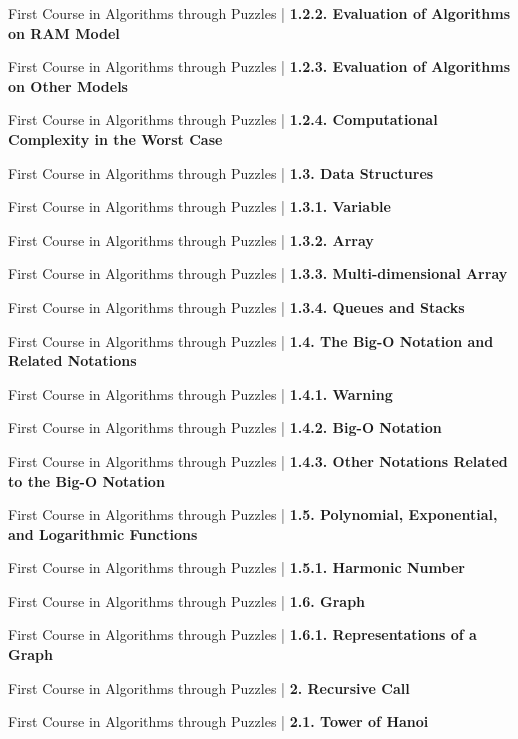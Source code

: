 \documentclass[a4, landscape, 12pt]{article}
\newcommand{\checkbox}{$\square$}%
\begin{document}
\begin{itemize}
{\item [\checkbox]  First Course in Algorithms through Puzzles | \textbf{ 1.2.2. Evaluation of Algorithms on RAM Model
}
\item [\checkbox]  First Course in Algorithms through Puzzles | \textbf{ 1.2.3. Evaluation of Algorithms on Other Models
}
\item [\checkbox]  First Course in Algorithms through Puzzles | \textbf{ 1.2.4. Computational Complexity in the Worst Case
}
\item [\checkbox]  First Course in Algorithms through Puzzles | \textbf{ 1.3. Data Structures
}
\item [\checkbox]  First Course in Algorithms through Puzzles | \textbf{ 1.3.1. Variable
}
\item [\checkbox]  First Course in Algorithms through Puzzles | \textbf{ 1.3.2. Array
}
\item [\checkbox]  First Course in Algorithms through Puzzles | \textbf{ 1.3.3. Multi-dimensional Array
}
\item [\checkbox]  First Course in Algorithms through Puzzles | \textbf{ 1.3.4. Queues and Stacks
}
\item [\checkbox]  First Course in Algorithms through Puzzles | \textbf{ 1.4. The Big-O Notation and Related Notations
}
\item [\checkbox]  First Course in Algorithms through Puzzles | \textbf{ 1.4.1. Warning
}
\item [\checkbox]  First Course in Algorithms through Puzzles | \textbf{ 1.4.2. Big-O Notation
}
\item [\checkbox]  First Course in Algorithms through Puzzles | \textbf{ 1.4.3. Other Notations Related to the Big-O Notation
}
\item [\checkbox]  First Course in Algorithms through Puzzles | \textbf{ 1.5. Polynomial, Exponential, and Logarithmic Functions
}
\item [\checkbox]  First Course in Algorithms through Puzzles | \textbf{ 1.5.1. Harmonic Number
}
\item [\checkbox]  First Course in Algorithms through Puzzles | \textbf{ 1.6. Graph
}
\item [\checkbox]  First Course in Algorithms through Puzzles | \textbf{ 1.6.1. Representations of a Graph
}
\item [\checkbox]  First Course in Algorithms through Puzzles | \textbf{ 2. Recursive Call
}
\item [\checkbox]  First Course in Algorithms through Puzzles | \textbf{ 2.1. Tower of Hanoi
}}
\end{itemize}
\end{document}
